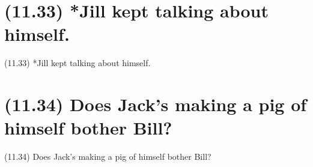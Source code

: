 \documentclass{article}
\begin{document}
\clearpage

%
%

\section*{(11.33) *Jill kept talking about himself.}

\bigbreak
\begin{enumerate*}
\item[(11.33)] *Jill kept talking about himself.
\end{enumerate*}
\bigbreak

\bigbreak
\begin{minipage}{\textwidth}
\end{minipage}
\bigbreak

\clearpage

%
%

\section*{(11.34) Does Jack's making a pig of himself bother Bill?}

\bigbreak
\begin{enumerate*}
\item[(11.34)] Does Jack's making a pig of himself bother Bill?
\end{enumerate*}
\bigbreak

\bigbreak
\begin{minipage}{\textwidth}
\end{minipage}
\bigbreak
\end{document}
